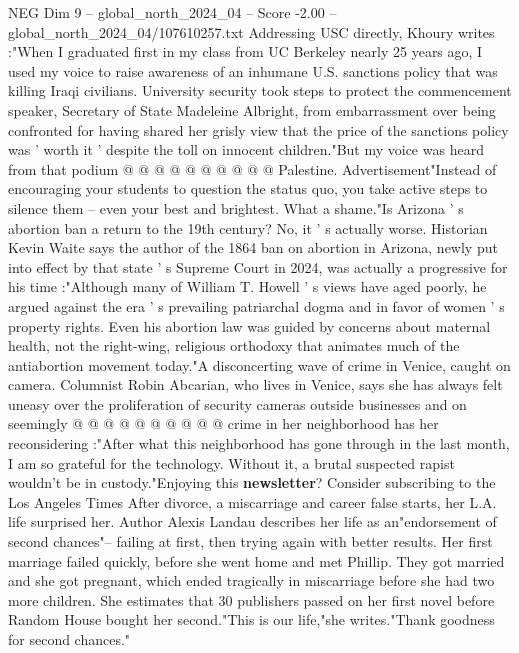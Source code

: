 \begin{textsample}{NEG Dim 9 – global\_north\_2024\_04 – Score -2.00 – global\_north\_2024\_04/107610257.txt}
Addressing USC directly, Khoury writes :"When I graduated first in my class from UC Berkeley nearly 25 years ago, I used my voice to raise awareness of an inhumane U.S. sanctions policy that was killing Iraqi civilians.
University security took steps to protect the commencement speaker, Secretary of State Madeleine Albright, from embarrassment over being confronted for having shared her grisly view that the price of the sanctions policy was ' worth it ' despite the toll on innocent children."But my voice was heard from that podium @ @ @ @ @ @ @ @ @ @ Palestine.
Advertisement"Instead of encouraging your students to question the status quo, you take active steps to silence them -- even your best and brightest.
What a shame."Is Arizona ' s abortion ban a return to the 19th century?
No, it ' s actually worse.
Historian Kevin Waite says the author of the 1864 ban on abortion in Arizona, newly put into effect by that state ' s Supreme Court in 2024, was actually a progressive for his time :"Although many of William T.
Howell ' s views have aged poorly, he argued against the era ' s prevailing patriarchal dogma and in favor of women ' s property rights.
Even his abortion law was guided by concerns about maternal health, not the right-wing, religious orthodoxy that animates much of the antiabortion movement today."A disconcerting wave of crime in Venice, caught on camera.
Columnist Robin Abcarian, who lives in Venice, says she has always felt uneasy over the proliferation of security cameras outside businesses and on seemingly @ @ @ @ @ @ @ @ @ @ crime in her neighborhood has her reconsidering :"After what this neighborhood has gone through in the last month, I am so grateful for the technology.
Without it, a brutal suspected rapist wouldn't be in custody."Enjoying this \textbf{newsletter}?
Consider subscribing to the Los Angeles Times After divorce, a miscarriage and career false starts, her L.A. life surprised her.
Author Alexis Landau describes her life as an"endorsement of second chances"-- failing at first, then trying again with better results.
Her first marriage failed quickly, before she went home and met Phillip.
They got married and she got pregnant, which ended tragically in miscarriage before she had two more children.
She estimates that 30 publishers passed on her first novel before Random House bought her second."This is our life,"she writes."Thank goodness for second chances."

\end{textsample}
